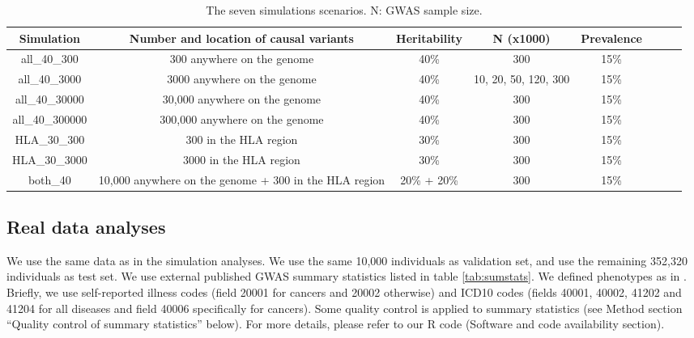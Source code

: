 \documentclass{bioinfo}
\begin{document}
\begin{methods}
\begin{table*}[htpb]
	\centering
	\begin{tabular}{|c|c|c|c|c|c|c|c|}
		\hline
		Simulation & Number and location of causal variants & Heritability & N (x1000) &  Prevalence \\
		\hline
		all\_40\_300 & 300 anywhere on the genome & 40\% & 300 & 15\% \\
		all\_40\_3000 & 3000 anywhere on the genome & 40\% & 10, 20, 50, 120, 300 & 15\% \\
		all\_40\_30000 & 30,000 anywhere on the genome & 40\% & 300 & 15\% \\
		all\_40\_300000 & 300,000 anywhere on the genome & 40\% & 300 & 15\% \\
		HLA\_30\_300 & 300 in the HLA region & 30\% & 300 & 15\% \\
		HLA\_30\_3000 & 3000 in the HLA region & 30\% & 300 & 15\% \\
		both\_40 & 10,000 anywhere on the genome + 300 in the HLA region & 20\% + 20\% & 300 & 15\% \\
		\hline
	\end{tabular}
	\caption{The seven simulations scenarios. N: GWAS sample size. \label{tab:simus}}
\end{table*}


\subsection*{Real data analyses}

We use the same data as in the simulation analyses. We use the same 10,000 individuals as validation set, and use the remaining 352,320 individuals as test set.
We use external published GWAS summary statistics listed in table \ref{tab:sumstats}.
We defined phenotypes as in \cite{prive2019making}. 
Briefly, we use self-reported illness codes (field 20001 for cancers and 20002 otherwise) and ICD10 codes (fields 40001, 40002, 41202 and 41204 for all diseases and field 40006 specifically for cancers).
Some quality control is applied to summary statistics (see Method section ``Quality control of summary statistics'' below).
For more details, please refer to our R code (Software and code availability section).


\end{methods}
\end{document}
